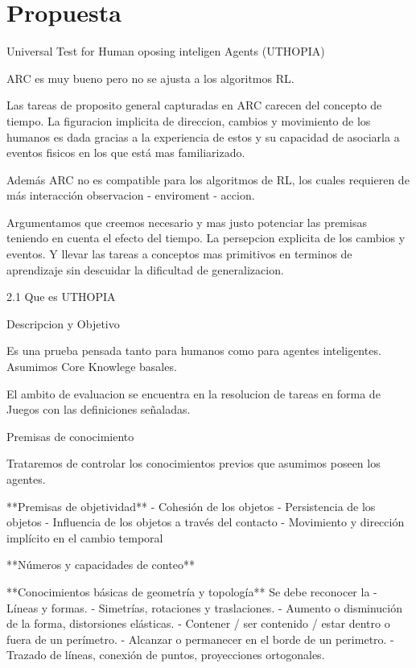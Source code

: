 \chapter{Propuesta}\label{chapter:proposal}


Universal Test for Human oposing inteligen Agents (UTHOPIA)

ARC es muy bueno pero no se ajusta a los algoritmos RL.

Las tareas de proposito general capturadas en ARC carecen del concepto de tiempo. La figuracion implicita de direccion, cambios y movimiento de los humanos es dada gracias a la experiencia de estos y su capacidad de asociarla a eventos fisicos en los que está mas familiarizado.

Además ARC no es compatible para los algoritmos de RL, los cuales requieren de más interacción observacion - enviroment - accion.

Argumentamos que creemos necesario y mas justo potenciar las premisas teniendo en cuenta el efecto del tiempo. La persepcion explicita de los cambios y eventos. Y llevar las tareas a conceptos mas primitivos en terminos de aprendizaje sin descuidar la dificultad de generalizacion.

2.1 Que es UTHOPIA

 Descripcion y Objetivo

Es una prueba pensada tanto para humanos como para agentes inteligentes. Asumimos Core Knowlege basales.

El ambito de evaluacion se encuentra en la resolucion de tareas en forma de Juegos con las definiciones señaladas.

Premisas de conocimiento 

Trataremos de controlar los conocimientos previos que asumimos poseen los agentes.

**Premisas de objetividad**
- Cohesión de los objetos
- Persistencia de los objetos
- Influencia de los objetos a través del contacto
- Movimiento y dirección implícito en el cambio temporal

**Números y capacidades de conteo**

**Conocimientos básicas de geometría y topología**
Se debe reconocer la 
- Líneas y formas.
- Simetrías, rotaciones y traslaciones.
- Aumento o disminución de la forma, distorsiones elásticas.
- Contener / ser contenido / estar dentro o fuera de un perímetro.
- Alcanzar o permanecer en el borde de un perimetro.
- Trazado de líneas, conexión de puntos, proyecciones ortogonales.
